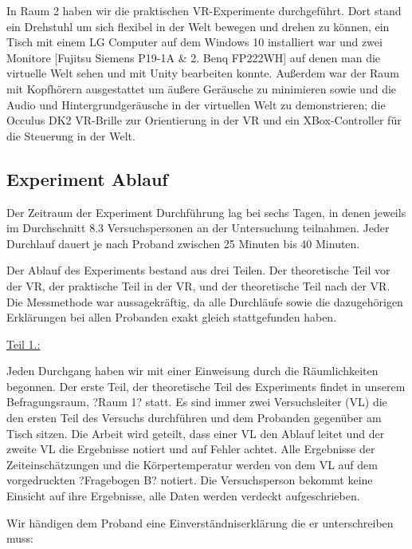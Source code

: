 \documentclass{Bericht}
\begin{document}
In Raum 2 haben wir die praktischen VR-Experimente durchgeführt. Dort stand ein Drehstuhl um sich flexibel in der Welt bewegen und drehen zu können, ein Tisch mit einem LG Computer auf dem  Windows 10 installiert war und zwei Monitore [Fujitsu Siemens P19-1A \& 2. Benq FP222WH] auf denen man die virtuelle Welt sehen und mit Unity bearbeiten konnte. Außerdem war der Raum mit Kopfhörern ausgestattet um äußere Geräusche zu minimieren sowie und die Audio und Hintergrundgeräusche in der virtuellen Welt zu demonstrieren; die Occulus DK2 VR-Brille zur Orientierung in der VR und ein XBox-Controller für die Steuerung in der Welt.


\subsection {Experiment Ablauf}

Der Zeitraum der Experiment Durchführung lag bei sechs Tagen, in denen jeweils im Durchschnitt 8.3 Versuchspersonen an der Untersuchung teilnahmen. Jeder Durchlauf dauert je nach Proband zwischen 25 Minuten bis 40 Minuten.

\par

Der Ablauf des Experiments bestand aus drei Teilen. Der theoretische Teil vor der VR, der praktische Teil in der VR, und der theoretische Teil nach der VR. Die Messmethode war aussagekräftig, da alle Durchläufe sowie die dazugehörigen Erklärungen bei allen Probanden exakt gleich stattgefunden haben.

\par

\underline{Teil 1.:}

Jeden Durchgang haben wir mit einer Einweisung durch die Räumlichkeiten begonnen. Der erste Teil, der theoretische Teil des Experiments findet in unserem Befragungsraum, ?Raum 1? statt. Es sind immer zwei Versuchsleiter (VL) die den ersten Teil des Versuchs durchführen und dem Probanden gegenüber am Tisch sitzen. Die Arbeit wird geteilt, dass einer VL den Ablauf leitet und der zweite VL die Ergebnisse notiert und auf Fehler achtet. Alle Ergebnisse der Zeiteinschätzungen und die Körpertemperatur werden von dem VL auf dem vorgedruckten ?Fragebogen B? notiert. Die Versuchsperson bekommt keine Einsicht auf ihre Ergebnisse, alle Daten werden verdeckt aufgeschrieben.

\par

Wir händigen dem Proband eine Einverständniserklärung die er unterschreiben muss:
\end{document}

